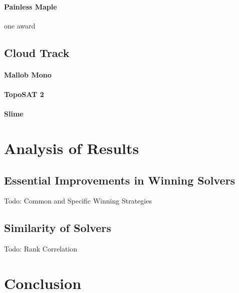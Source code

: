 \documentclass{elsarticle}
\newcommand{\todo}[1]{{\color{purple}Todo: #1}}
\begin{document}
\paragraph{Painless Maple} one award


\subsection{Cloud Track}

\paragraph{Mallob Mono}

\paragraph{TopoSAT 2}

\paragraph{Slime}


\section{Analysis of Results}

\subsection{Essential Improvements in Winning Solvers}

\todo{Common and Specific Winning Strategies}

\subsection{Similarity of Solvers}

\todo{Rank Correlation}


\section{Conclusion}





\end{document}
